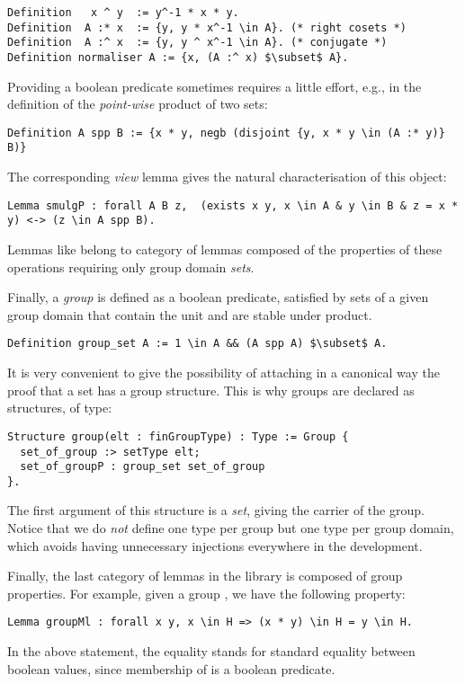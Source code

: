 \begin{lstlisting}
Definition   x ^ y  := y^-1 * x * y. 
Definition  A :* x  := {y, y * x^-1 \in A}. (* right cosets *)
Definition  A :^ x  := {y, y ^ x^-1 \in A}. (* conjugate *)
Definition normaliser A := {x, (A :^ x) $\subset$ A}.
\end{lstlisting}
Providing a boolean predicate sometimes requires a little effort, e.g.,
in the definition of the \emph{point-wise} product of two sets:
\begin{lstlisting}
Definition A spp B := {x * y, negb (disjoint {y, x * y \in (A :* y)} B)}
\end{lstlisting}
\noindent The corresponding \emph{view} lemma gives the natural characterisation of this object:
\begin{lstlisting}
Lemma smulgP : forall A B z,  (exists x y, x \in A & y \in B & z = x * y) <-> (z \in A spp B).
\end{lstlisting}
Lemmas like  belong to  category of lemmas 
composed of the properties of these operations requiring only group domain \emph{sets}.


Finally, a \emph{group} is defined as a boolean predicate, satisfied by
sets of a given group domain that contain the unit and are stable
under product.

\begin{lstlisting}
Definition group_set A := 1 \in A && (A spp A) $\subset$ A.\end{lstlisting}
It is very convenient to give the possibility of attaching in a
canonical way the proof that a set has a group structure. This is
why groups are declared as structures, of type:

\begin{lstlisting}
Structure group(elt : finGroupType) : Type := Group {
  set_of_group :> setType elt;
  set_of_groupP : group_set set_of_group
}.
\end{lstlisting}
The first argument of this structure is a \emph{set}, giving the
carrier of the group. Notice that we do \emph{not} define one type per group 
but one type per group domain, which avoids having unnecessary injections
everywhere in the development.

Finally, the last category of lemmas in the library is composed of
group properties.  For example, given a group , we have the following
property:

\begin{lstlisting}
Lemma groupMl : forall x y, x \in H => (x * y) \in H = y \in H.
\end{lstlisting}
In the above statement, the equality stands for \Coq{} standard equality
between boolean values, since membership of  is a boolean
predicate.


